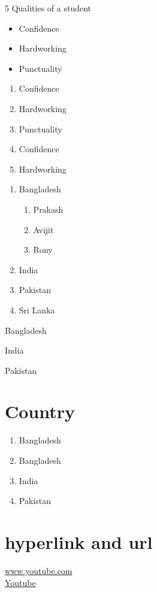 \documentclass{article}
\begin{document}
5 Qualities of a student
\begin{itemize}
\item Confidence
\item Hardworking
\item Punctuality
\end{itemize}

\begin{enumerate}
    \item Confidence
    \item Hardworking
    \item Punctuality
    \item Confidence
    \item Hardworking
\end{enumerate}

\begin{enumerate}
\item Bangladesh
    \begin{enumerate}
        \item Prakash
        \item Avijit
        \item Rony
    \end{enumerate}
\item India
\item Pakistan
\item Sri Lanka
\end{enumerate}

\begin{inparaenum}[a)]

\item Bangladesh
\item India
\item Pakistan

\end{inparaenum}

\section{Country}
\begin{enumerate}[label=\roman*]
\item Bangladesh
\item Bangladesh
\item India
\item Pakistan
\end{enumerate}


\section{hyperlink and url}
\url{www.youtube.com} \\
\href{www.youtube.com}{Youtube}
\end{document}
